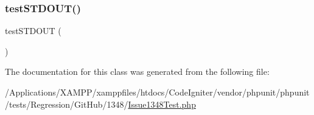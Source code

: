\mbox{\label{class_issue1348_test_a7444983935e38eaf04e6df1391e20977}} 
\subsubsection{\texorpdfstring{test\+S\+T\+D\+O\+U\+T()}{testSTDOUT()}}
{\footnotesize\ttfamily test\+S\+T\+D\+O\+UT (\begin{DoxyParamCaption}{ }\end{DoxyParamCaption})}



The documentation for this class was generated from the following file\+:\begin{DoxyCompactItemize}
\item 
/\+Applications/\+X\+A\+M\+P\+P/xamppfiles/htdocs/\+Code\+Igniter/vendor/phpunit/phpunit/tests/\+Regression/\+Git\+Hub/1348/\mbox{\hyperlink{_issue1348_test_8php}{Issue1348\+Test.\+php}}\end{DoxyCompactItemize}
